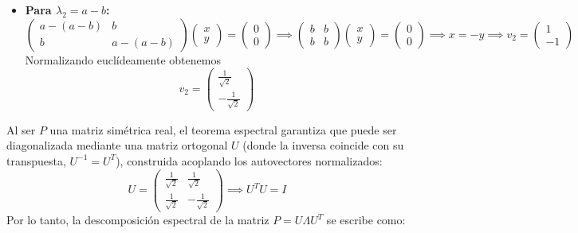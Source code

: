 \begin{ejemplo}
\begin{description}
\begin{itemize}
            \item \textbf{Para $\lambda_2 = a-b$:}
            \[ 
            \begin{pmatrix} a-(a-b) & b \\ b & a-(a-b) \end{pmatrix}\begin{pmatrix} x \\ y \end{pmatrix} = \begin{pmatrix} 0 \\ 0 \end{pmatrix} \implies \begin{pmatrix} b & b \\ b & b \end{pmatrix}\begin{pmatrix} x \\ y \end{pmatrix} = \begin{pmatrix} 0 \\ 0 \end{pmatrix} \implies x = -y \implies v_2 = \begin{pmatrix} 1 \\ -1 \end{pmatrix}
            \]
            Normalizando euclídeamente obtenemos 
            $$v_2 = \begin{pmatrix} \frac{1}{\sqrt{2}} \\[0.1cm] -\frac{1}{\sqrt{2}} \end{pmatrix}$$
        \end{itemize}
        \item[\tbf{Diagonalización y Matriz de Transición Ortogonal.}] Al ser $P$ una matriz simétrica real, el teorema espectral garantiza que puede ser diagonalizada mediante una matriz ortogonal $U$ (donde la inversa coincide con su transpuesta, $U^{-1} = U^T$), construida acoplando los autovectores normalizados:
        \[ 
        U = \begin{pmatrix} \frac{1}{\sqrt{2}} & \frac{1}{\sqrt{2}} \\[0.15cm] \frac{1}{\sqrt{2}} & -\frac{1}{\sqrt{2}} \end{pmatrix} \implies U^T U = I
        \]
        Por lo tanto, la descomposición espectral de la matriz $P = U \Lambda U^T$ se escribe como:
        \[ 
\]
\end{description}
\end{ejemplo}
